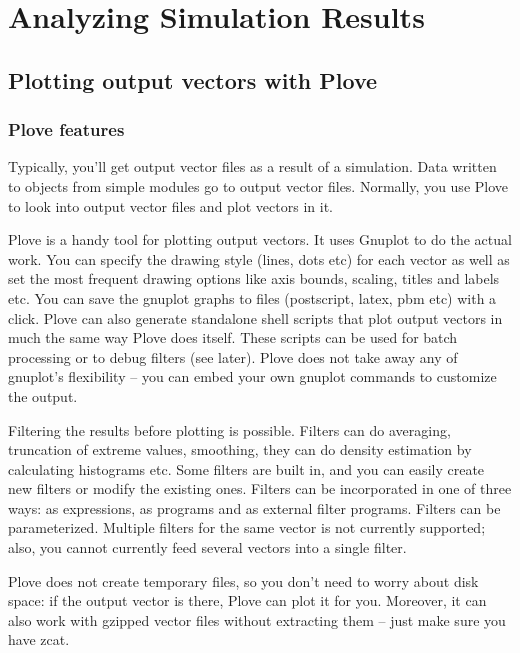 \chapter{Analyzing Simulation Results}
\label{cha:analyszing-simulation-results}



\section{Plotting output vectors with Plove}

\subsection{Plove features}

Typically, you'll get output vector files as a result of a simulation.
Data written to  objects from
simple modules go to output vector
files. Normally, you use Plove to look
into output vector files and plot vectors in it.

Plove is a handy tool for plotting {\opp} output vectors.
It uses Gnuplot to do the actual work. You can specify
the drawing style (lines, dots etc) for each vector as well as set the
most frequent drawing options like axis bounds, scaling, titles and
labels etc. You can save the gnuplot graphs to files (postscript,
latex, pbm etc) with a click. Plove can also generate standalone shell
scripts that plot output vectors in much the same way Plove does
itself. These scripts can be used for batch processing or to debug
filters (see later). Plove does not take away any of gnuplot's
flexibility -- you can embed your own gnuplot commands to customize
the output.


Filtering the results before plotting is
possible. Filters can do averaging, truncation of extreme values,
smoothing, they can do density estimation by
calculating histograms etc. Some filters are built
in, and you can easily create new filters or modify the existing ones.
Filters can be incorporated in one of three ways: as  expressions,
as  programs and as external filter programs. Filters can be
parameterized. Multiple filters for the same vector is not currently
supported; also, you cannot currently feed several vectors into a
single filter.

Plove does not create temporary files, so you don't need to worry 
about disk space: if the output vector is there, Plove can plot 
it for you. Moreover, it can also work with gzipped vector files 
without extracting them -- just make sure you have zcat.


